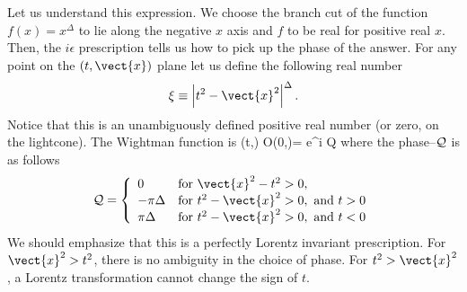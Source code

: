 Let us understand this expression. We choose the branch cut of the function $f(x) = x^{\Delta}$ to lie along the negative $x$ axis and $f$ to be real for positive real $x$. Then, the $i \epsilon$ prescription tells us
how to pick up the phase of the answer. For any point on the $(t,\vect{x})$ plane let us define the following real number
\[
\xi \equiv \left|t^2 - \vect{x}^2\right|^{\Delta} .
 \]
Notice that this is an unambiguously defined positive real number (or zero, on the lightcone). The Wightman function is
\be
\label{wightman}
(t,) {\cal O}(0,)\rvac = {e^{i {\cal Q}}\over \xi}
\ee
where the phase--${\cal Q}$ is as follows
\[
{\cal Q} = \left\{\begin{array}{ll}
0&\text{for}~\vect{x}^2 - t^2 > 0,\\
-\pi \Delta&\text{for}~t^2 - \vect{x}^2 > 0,~{\rm and}~t>0\\
 \pi \Delta&\text{for}~t^2 - \vect{x}^2 > 0,~{\rm and}~t<0\\
\end{array}\right.
 \]
We should emphasize that this is a perfectly Lorentz invariant prescription. For $\vect{x}^2 > t^2$, there is no ambiguity in the choice of phase. For $t^2 > \vect{x}^2$, a Lorentz transformation cannot change the sign of $t$. 





